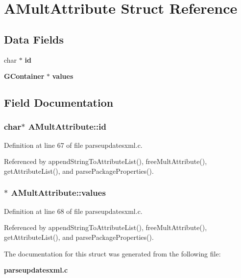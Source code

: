 \section{AMult\-Attribute Struct Reference}
\label{structAMultAttribute}
\subsection*{Data Fields}
\begin{CompactItemize}
\item 
char $\ast$ {\bf id}
\item 
{\bf GContainer} $\ast$ {\bf values}
\end{CompactItemize}


\subsection{Field Documentation}
\subsubsection{\setlength{\rightskip}{0pt plus 5cm}char$\ast$ {\bf AMult\-Attribute::id}}\label{structAMultAttribute_o0}




Definition at line 67 of file parseupdatesxml.c.

Referenced by append\-String\-To\-Attribute\-List(), free\-Mult\-Attribute(), get\-Attribute\-List(), and parse\-Package\-Properties().
\subsubsection{$\ast$ {\bf AMult\-Attribute::values}}\label{structAMultAttribute_o1}




Definition at line 68 of file parseupdatesxml.c.

Referenced by append\-String\-To\-Attribute\-List(), free\-Mult\-Attribute(), get\-Attribute\-List(), and parse\-Package\-Properties().

The documentation for this struct was generated from the following file:\begin{CompactItemize}
\item 
{\bf parseupdatesxml.c}\end{CompactItemize}
